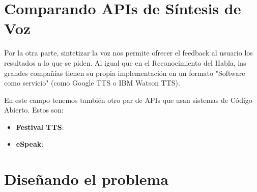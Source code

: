 \section{Comparando APIs de Síntesis de Voz}
Por la otra parte, sintetizar la voz nos permite ofrecer el feedback al usuario los resultados a lo que se piden. Al igual que en el Reconocimiento del Habla, las grandes compañías tienen su propia implementación en un formato "Software como servicio" (como Google TTS o IBM Watson TTS).

En este campo tenemos también otro par de APIs que usan sistemas de Código Abierto. Estos son:

\begin{itemize}
	\item \textbf{Festival TTS}:
	\item \textbf{eSpeak}: 
\end{itemize}

\section{Diseñando el problema}
 
